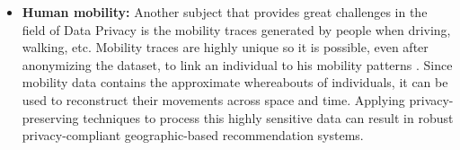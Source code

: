 \begin{itemize}
	\item \textbf{Human mobility:} Another subject that provides great challenges in the field of Data Privacy is the mobility traces generated by people when driving, walking, etc. Mobility traces are highly unique so it is possible, even after anonymizing the dataset, to link an individual to his mobility patterns \cite{de2013unique}. Since mobility data contains the approximate whereabouts of individuals, it can be used to reconstruct their movements across space and time. Applying privacy-preserving techniques to process this highly sensitive data can result in robust privacy-compliant geographic-based recommendation systems.
\end{itemize}


